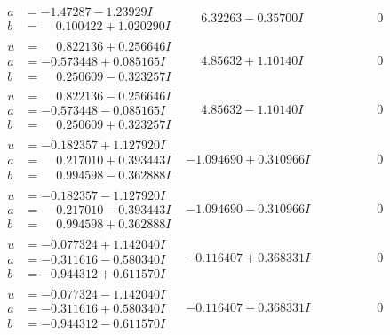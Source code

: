 \documentclass[1p]{elsarticle_modified}
\theoremstyle{definition}
\begin{document}
$$\begin{array}{c|c|c}
\begin{aligned}
a &= -1.47287 - 1.23929 I \\
b &= \phantom{-}0.100422 + 1.020290 I\end{aligned}
 & \phantom{-}6.32263 - 0.35700 I & \phantom{-0.000000 } 0 \\ \hline\begin{aligned}
u &= \phantom{-}0.822136 + 0.256646 I \\
a &= -0.573448 + 0.085165 I \\
b &= \phantom{-}0.250609 - 0.323257 I\end{aligned}
 & \phantom{-}4.85632 + 1.10140 I & \phantom{-0.000000 } 0 \\ \hline\begin{aligned}
u &= \phantom{-}0.822136 - 0.256646 I \\
a &= -0.573448 - 0.085165 I \\
b &= \phantom{-}0.250609 + 0.323257 I\end{aligned}
 & \phantom{-}4.85632 - 1.10140 I & \phantom{-0.000000 } 0 \\ \hline\begin{aligned}
u &= -0.182357 + 1.127920 I \\
a &= \phantom{-}0.217010 + 0.393443 I \\
b &= \phantom{-}0.994598 - 0.362888 I\end{aligned}
 & -1.094690 + 0.310966 I & \phantom{-0.000000 } 0 \\ \hline\begin{aligned}
u &= -0.182357 - 1.127920 I \\
a &= \phantom{-}0.217010 - 0.393443 I \\
b &= \phantom{-}0.994598 + 0.362888 I\end{aligned}
 & -1.094690 - 0.310966 I & \phantom{-0.000000 } 0 \\ \hline\begin{aligned}
u &= -0.077324 + 1.142040 I \\
a &= -0.311616 - 0.580340 I \\
b &= -0.944312 + 0.611570 I\end{aligned}
 & -0.116407 + 0.368331 I & \phantom{-0.000000 } 0 \\ \hline\begin{aligned}
u &= -0.077324 - 1.142040 I \\
a &= -0.311616 + 0.580340 I \\
b &= -0.944312 - 0.611570 I\end{aligned}
 & -0.116407 - 0.368331 I & \phantom{-0.000000 } 0\\

\end{array}$$
\end{document}
